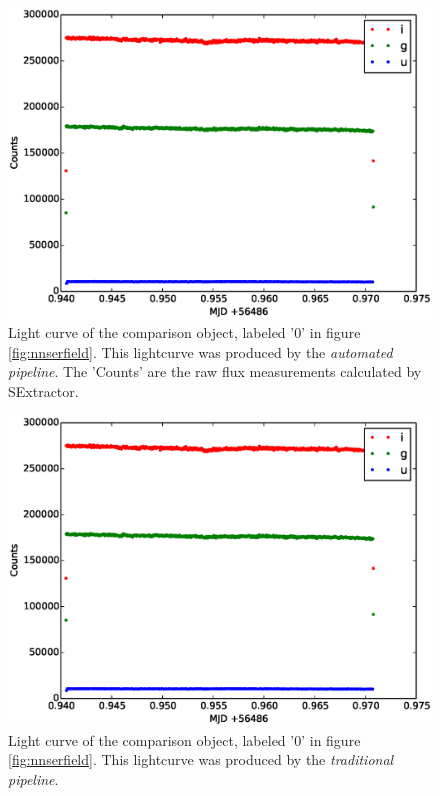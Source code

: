 \begin{figure}[!h]
\centering
\includegraphics[width=140mm]{images/comparison_auto.eps}
\caption{Light curve of the comparison object, labeled '0' in figure \ref{fig:nnserfield}. This lightcurve was produced by the \emph{automated pipeline}. The 'Counts' are the raw flux measurements calculated by SExtractor.  }
\label{fig:nnsercomparisonauto}
\end{figure}

\begin{figure}[!h]
\centering
\includegraphics[width=140mm]{images/comparison_auto.eps}
\caption{Light curve of the comparison object, labeled '0' in figure \ref{fig:nnserfield}. This lightcurve was produced by the \emph{traditional pipeline}. }
\label{fig:nnsercomparisontom}
\end{figure}

